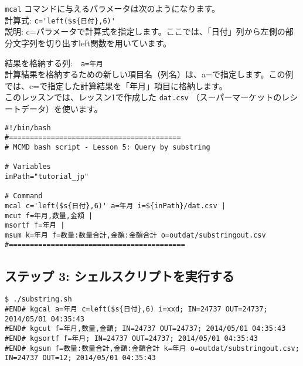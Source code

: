 {\setlength{\parindent}{0cm}

\verb|mcal| コマンドに与えるパラメータは次のようになります。\\

計算式: \verb|c='left($s{日付},6)'|\\
説明: c=パラメータで計算式を指定します。ここでは、「日付」列から左側の部分文字列を切り出すleft関数を用いています。


結果を格納する列:　\verb|a=年月| \\
計算結果を格納するための新しい項目名（列名）は、a=で指定します。この例では、c=で指定した計算結果を「年月」項目に格納します。\\

このレッスンでは、レッスン1で作成した \verb|dat.csv| （スーパーマーケットのレシートデータ）を使います。
}

\begin{verbatim}
#!/bin/bash
#=========================================
# MCMD bash script - Lesson 5: Query by substring

# Variables
inPath="tutorial_jp"

# Command 
mcal c='left($s{日付},6)' a=年月 i=${inPath}/dat.csv |
mcut f=年月,数量,金額 |
msortf f=年月 |
msum k=年月 f=数量:数量合計,金額:金額合計 o=outdat/substringout.csv
#==========================================
\end{verbatim}

\subsection{ステップ 3: シェルスクリプトを実行する}

\begin{verbatim}
$ ./substring.sh
#END# kgcal a=年月 c=left($s{日付},6) i=xxd; IN=24737 OUT=24737; 2014/05/01 04:35:43
#END# kgcut f=年月,数量,金額; IN=24737 OUT=24737; 2014/05/01 04:35:43
#END# kgsortf f=年月; IN=24737 OUT=24737; 2014/05/01 04:35:43
#END# kgsum f=数量:数量合計,金額:金額合計 k=年月 o=outdat/substringout.csv; IN=24737 OUT=12; 2014/05/01 04:35:43
\end{verbatim}

